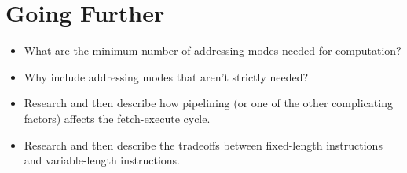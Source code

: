 \section{Going Further}

\begin{itemize}\item What are the minimum number of addressing modes needed for computation? 
\item Why include addressing modes that aren't strictly needed? 
\item Research and then describe how pipelining (or one of the other complicating factors) affects the fetch-execute cycle. 
\item Research and then describe the tradeoffs between fixed-length instructions and variable-length instructions. 
\end{itemize}

